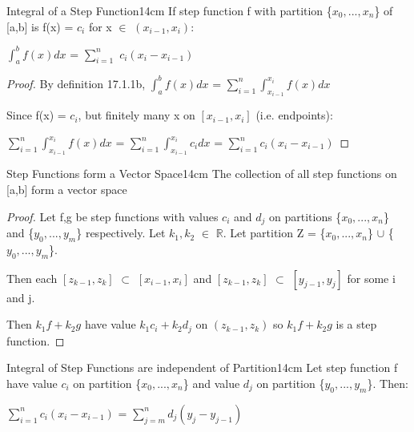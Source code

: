     \vspace{0.5cm}



    \begin{wtheorem}{Integral of a Step Function}{14cm}
        If step function f with partition \{$x_0,...,x_n$\} of [a,b]
        is f(x) = $c_i$ for x $\in$ $(x_{i-1},x_i)$:

        \hspace{0.5cm}
        $\int_a^b f(x) dx$
        = $\sum_{i=1}^n$ $c_i(x_i - x_{i-1})$
    \end{wtheorem}

    \begin{proof}
        By {\color{blue} definition 17.1.1b},
        $\int_a^b f(x) dx$
        = $\sum_{i=1}^n \int_{x_{i-1}}^{x_i} f(x) dx$

        Since f(x) = $c_i$, but finitely many x on $[x_{i-1},x_i]$ (i.e. endpoints):

        \hspace{0.5cm}
        $\sum_{i=1}^n \int_{x_{i-1}}^{x_i} f(x) dx$
        = $\sum_{i=1}^n \int_{x_{i-1}}^{x_i} c_i dx$
        = $\sum_{i=1}^n c_i(x_i - x_{i-1})$
    \end{proof}

    \newpage



    \begin{wtheorem}{Step Functions form a Vector Space}{14cm}
        The collection of all step functions on [a,b] form a vector space
    \end{wtheorem}

    \begin{proof}
        Let f,g be step functions with values $c_i$ and $d_j$ on partitions
        \{$x_0,...,x_n$\} and \{$y_0,...,y_m$\} respectively.
        Let $k_1,k_2$ $\in$ $\mathbb{R}$.
        Let partition Z = \{$x_0,...,x_n$\} $\cup$ \{$y_0,...,y_m$\}.

        Then each $[z_{k-1},z_k]$ $\subset$ $[x_{i-1},x_i]$
        and $[z_{k-1},z_k]$ $\subset$ $[y_{j-1},y_j]$ for some i and j.

        Then $k_1f + k_2g$
        have value $k_1c_i + k_2d_j$ on $(z_{k-1},z_k)$
        so $k_1f + k_2g$ is a step function.
    \end{proof}

    \vspace{0.5cm}



    \begin{wtheorem}{Integral of Step Functions are independent of Partition}{14cm}
        Let step function f have value $c_i$ on partition \{$x_0,...,x_n$\}
        and value $d_j$ on partition \{$y_0,...,y_m$\}. Then:

        \hspace{0.5cm}
        $\sum_{i=1}^n c_i(x_i - x_{i-1})$
        = $\sum_{j=m}^n d_j(y_j - y_{j-1})$
    \end{wtheorem}

